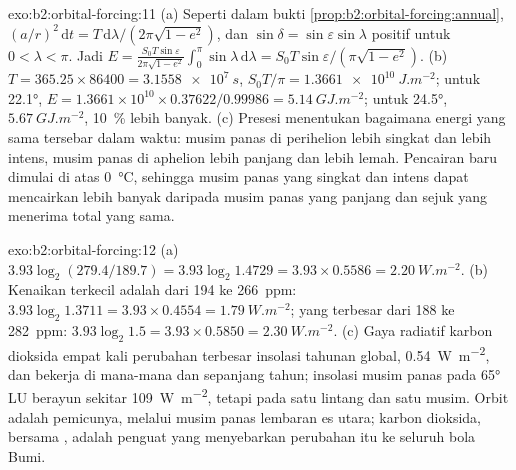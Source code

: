 \begin{solution}{exo:b2:orbital-forcing:11}
(a) Seperti dalam bukti \cref{prop:b2:orbital-forcing:annual}, $(a/r)^2\,\mathrm dt =
T\,\mathrm d\lambda/(2\pi\sqrt{1 - e^2})$, dan $\sin\delta = \sin\varepsilon\sin\lambda$ positif
untuk $0 < \lambda < \pi$. Jadi $E = \frac{S_0T\sin\varepsilon}{2\pi\sqrt{1 - e^2}}\int_0^{\pi}\sin\lambda
\,\mathrm d\lambda = S_0T\sin\varepsilon/(\pi\sqrt{1 - e^2})$. (b) $T = 365.25 \times 86400 =
\qty{3.1558e7}{s}$, $S_0T/\pi = \qty{1.3661e10}{J.m^{-2}}$; untuk \ang{22.1}, $E = 1.3661 \times 10^{10}
\times 0.37622/0.99986 = \qty{5.14}{GJ.m^{-2}}$; untuk \ang{24.5}, $\qty{5.67}{GJ.m^{-2}}$,
\qty{10}{\percent} lebih banyak. (c) Presesi menentukan bagaimana energi yang sama tersebar dalam waktu: musim panas
di perihelion lebih singkat dan lebih intens, musim panas di aphelion lebih panjang dan lebih lemah. Pencairan baru dimulai
di atas \qty{0}{\celsius}, sehingga musim panas yang singkat dan intens dapat mencairkan lebih banyak daripada musim panas yang panjang dan sejuk
yang menerima total yang sama.
\end{solution}

\begin{solution}{exo:b2:orbital-forcing:12}
(a) $3.93\log_2(279.4/189.7) = 3.93\log_2 1.4729 = 3.93 \times 0.5586 = \qty{2.20}{W.m^{-2}}$. (b)
Kenaikan terkecil adalah dari 194 ke \qty{266}{ppm}: $3.93\log_2 1.3711 = 3.93 \times 0.4554 =
\qty{1.79}{W.m^{-2}}$; yang terbesar dari 188 ke \qty{282}{ppm}: $3.93\log_2 1.5 = 3.93 \times 0.5850 =
\qty{2.30}{W.m^{-2}}$. (c) Gaya radiatif karbon dioksida empat kali perubahan terbesar
insolasi tahunan global, \qty{0.54}{W.m^{-2}}, dan bekerja di mana-mana dan sepanjang tahun; insolasi musim panas
pada \ang{65} LU berayun sekitar \qty{109}{W.m^{-2}}, tetapi pada satu lintang dan satu musim.
Orbit adalah pemicunya, melalui musim panas lembaran es utara; karbon dioksida, bersama
, adalah penguat yang menyebarkan perubahan itu ke seluruh bola Bumi.
\end{solution}

